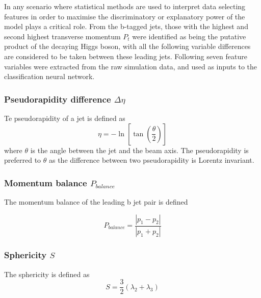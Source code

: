 
In any scenario where statistical methods are used to interpret data selecting features in order to maximise the discriminatory or explanatory power of the model plays a critical role.
From the b-tagged jets, those with the highest and second highest transverse momentum $P_t$ were identified as being the putative product of the decaying Higgs boson, with all the following variable differences are considered to be taken between these leading jets. 
Following \cite{Abazov201197} seven feature variables were extracted from the raw simulation data, and used as inputs to the classification neural network. 

\subsubsection*{Pseudorapidity difference $ \Delta\eta $ } %
\label{ssub:pseudorapidity}

Te pseudorapidity of a jet is defined as
\begin{equation}
	\eta = - \ln\left[\tan\left( \frac{\theta}{2} \right)\right]
\end{equation}
where $\theta$ is the angle between the jet and the beam axis. The pseudorapidity is preferred to $\theta$ as the difference between two pseudorapidity is Lorentz invariant.


\subsubsection*{Momentum balance $P_{balance}$} %
\label{ssub:momentum_balance_p__balance}

The momentum balance of the leading b jet pair is defined

\begin{equation}
	P_{balance} = \frac{\left|p_1 - p_2\right|}{ \left|p_1 + p_2\right|}  
\end{equation}


\subsubsection*{Sphericity $S$} %
\label{ssub:sphericity_s}
	The sphericity is defined as 
	\begin{equation}
		S = \frac{3}{2} (\lambda_2 + \lambda_3)
	\end{equation}

